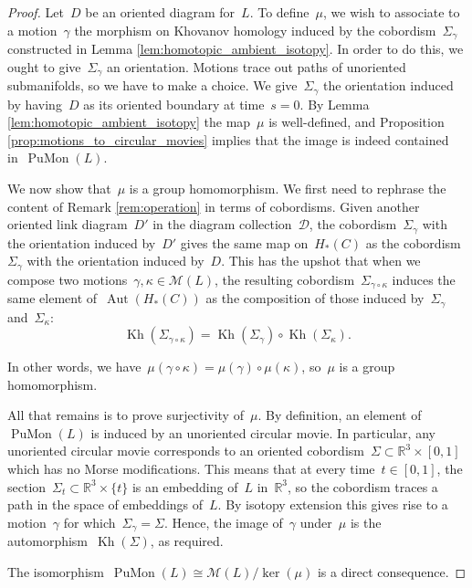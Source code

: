 \documentclass{amsart}
\theoremstyle{definition}
\theoremstyle{definition}
\theoremstyle{definition}
\theoremstyle{definition}
\newcommand{\R}{\mathbb{R}}
\newcommand{\Dcal}{\mathcal{D}}
\newcommand{\calM}{\mathcal{M}}
\DeclareMathOperator{\PuMon}{PuMon}
\DeclareMathOperator{\Kh}{Kh}
\DeclareMathOperator{\Aut}{Aut}
\begin{document}
\begin{proof}
Let~$D$ be an oriented diagram for~$L$. To define~$\mu$, we wish to associate to a motion~$\gamma$ the morphism on Khovanov homology induced by the cobordism~$\Sigma_\gamma$ constructed in Lemma \ref{lem:homotopic_ambient_isotopy}. In order to do this, we ought to give~$\Sigma_\gamma$ an orientation. Motions trace out paths of unoriented submanifolds, so we have to make a choice. We give~$\Sigma_\gamma$ the orientation induced by having~$D$ as its oriented boundary at time~$s=0$. By Lemma \ref{lem:homotopic_ambient_isotopy} the map~$\mu$ is well-defined, and Proposition \ref{prop:motions_to_circular_movies} implies that the image is indeed contained in~$\PuMon(L)$.
 
We now show that~$\mu$ is a group homomorphism. We first need to rephrase the content of Remark \ref{rem:operation} in terms of cobordisms. Given another oriented link diagram~$D'$ in the diagram collection~$\Dcal$, the cobordism~$\Sigma_\gamma$ with the orientation induced by~$D'$ gives the same map on~$H_*(C)$ as the cobordism~$\Sigma_\gamma$ with the orientation induced by~$D$. This has the upshot that when we compose two motions~$\gamma, \kappa \in \calM(L)$, the resulting cobordism~$\Sigma_{\gamma \circ \kappa}$ induces the same element of~$\Aut(H_\ast(C))$ as the composition of those induced by~$\Sigma_\gamma$ and~$\Sigma_\kappa$:
\[\Kh\left(\Sigma_{\gamma \circ \kappa}\right) = \Kh\left(\Sigma_\gamma\right) \circ \Kh\left(\Sigma_\kappa\right).\]

In other words, we have~$\mu(\gamma \circ \kappa)=\mu(\gamma)\circ \mu(\kappa)$, so~$\mu$ is a group homomorphism.
 
All that remains is to prove surjectivity of~$\mu$. By definition, an element of~$\PuMon(L)$ is induced by an unoriented circular movie. In particular, any unoriented circular movie corresponds to an oriented cobordism~$\Sigma \subset \R^3 \times [0,1]$ which has no Morse modifications. This means that at every time~$t \in [0, 1]$, the section~$\Sigma_t \subset \R^3 \times \{t\}$ is an embedding of~$L$ in~$\R^3$, so the cobordism traces a path in the space of embeddings of~$L$. By isotopy extension this gives rise to a motion~$\gamma$ for which~$\Sigma_\gamma=\Sigma$. Hence, the image of~$\gamma$ under~$\mu$ is the automorphism~$\Kh(\Sigma)$, as required. 

The isomorphism~$\PuMon(L) \cong \calM(L)/\ker(\mu)$ is a direct consequence.
\end{proof}
\end{document}
